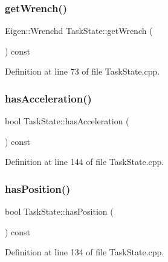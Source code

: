 \subsubsection{\texorpdfstring{get\+Wrench()}{getWrench()}}
{\footnotesize\ttfamily Eigen\+::\+Wrenchd Task\+State\+::get\+Wrench (\begin{DoxyParamCaption}{ }\end{DoxyParamCaption}) const}



Definition at line 73 of file Task\+State.\+cpp.

\hypertarget{classocra_1_1TaskState_a345c1cdb0c0bc05d087153b3018a1811}{}\label{classocra_1_1TaskState_a345c1cdb0c0bc05d087153b3018a1811} 
\subsubsection{\texorpdfstring{has\+Acceleration()}{hasAcceleration()}}
{\footnotesize\ttfamily bool Task\+State\+::has\+Acceleration (\begin{DoxyParamCaption}{ }\end{DoxyParamCaption}) const}



Definition at line 144 of file Task\+State.\+cpp.

\hypertarget{classocra_1_1TaskState_a1f6358128f62c6200b9a48b0600d58b8}{}\label{classocra_1_1TaskState_a1f6358128f62c6200b9a48b0600d58b8} 
\subsubsection{\texorpdfstring{has\+Position()}{hasPosition()}}
{\footnotesize\ttfamily bool Task\+State\+::has\+Position (\begin{DoxyParamCaption}{ }\end{DoxyParamCaption}) const}



Definition at line 134 of file Task\+State.\+cpp.

\hypertarget{classocra_1_1TaskState_aad8be338fe82467edd8060644176e82e}{}\label{classocra_1_1TaskState_aad8be338fe82467edd8060644176e82e} 
